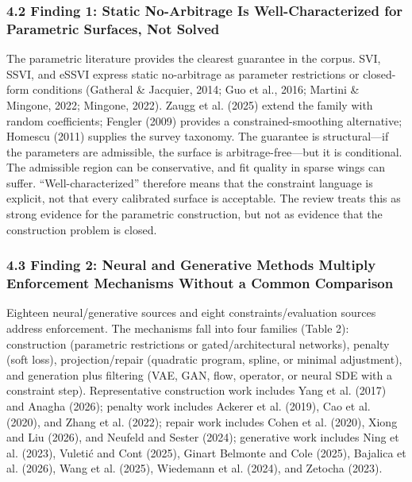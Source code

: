 \documentclass[11pt]{article}
\begin{document}
\subsubsection*{4.2 Finding 1: Static No-Arbitrage Is Well-Characterized for Parametric Surfaces, Not Solved}
The parametric literature provides the clearest guarantee in the corpus. SVI, SSVI, and eSSVI express static no-arbitrage as parameter restrictions or closed-form conditions (Gatheral \& Jacquier, 2014; Guo et al., 2016; Martini \& Mingone, 2022; Mingone, 2022). Zaugg et al. (2025) extend the family with random coefficients; Fengler (2009) provides a constrained-smoothing alternative; Homescu (2011) supplies the survey taxonomy. The guarantee is structural—if the parameters are admissible, the surface is arbitrage-free—but it is conditional. The admissible region can be conservative, and fit quality in sparse wings can suffer. “Well-characterized” therefore means that the constraint language is explicit, not that every calibrated surface is acceptable. The review treats this as strong evidence for the parametric construction, but not as evidence that the construction problem is closed.

\subsubsection*{4.3 Finding 2: Neural and Generative Methods Multiply Enforcement Mechanisms Without a Common Comparison}
Eighteen neural/generative sources and eight constraints/evaluation sources address enforcement. The mechanisms fall into four families (Table 2): construction (parametric restrictions or gated/architectural networks), penalty (soft loss), projection/repair (quadratic program, spline, or minimal adjustment), and generation plus filtering (VAE, GAN, flow, operator, or neural SDE with a constraint step). Representative construction work includes Yang et al. (2017) and Anagha (2026); penalty work includes Ackerer et al. (2019), Cao et al. (2020), and Zhang et al. (2022); repair work includes Cohen et al. (2020), Xiong and Liu (2026), and Neufeld and Sester (2024); generative work includes Ning et al. (2023), Vuletić and Cont (2025), Ginart Belmonte and Cole (2025), Bajalica et al. (2026), Wang et al. (2025), Wiedemann et al. (2024), and Zetocha (2023).
\end{document}
